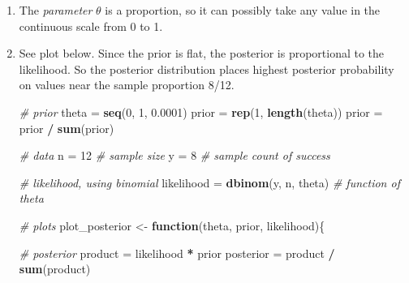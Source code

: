 \documentclass[
]{book}
\newenvironment{Shaded}{\begin{snugshade}}{\end{snugshade}}
\newcommand{\CommentTok}[1]{\textcolor[rgb]{0.56,0.35,0.01}{\textit{#1}}}
\newcommand{\ControlFlowTok}[1]{\textcolor[rgb]{0.13,0.29,0.53}{\textbf{#1}}}
\newcommand{\DecValTok}[1]{\textcolor[rgb]{0.00,0.00,0.81}{#1}}
\newcommand{\FloatTok}[1]{\textcolor[rgb]{0.00,0.00,0.81}{#1}}
\newcommand{\KeywordTok}[1]{\textcolor[rgb]{0.13,0.29,0.53}{\textbf{#1}}}
\newcommand{\NormalTok}[1]{#1}
\newcommand{\OperatorTok}[1]{\textcolor[rgb]{0.81,0.36,0.00}{\textbf{#1}}}
\newcommand{\StringTok}[1]{\textcolor[rgb]{0.31,0.60,0.02}{#1}}
\theoremstyle{definition}
\theoremstyle{definition}
\theoremstyle{definition}
\theoremstyle{remark}
\begin{document}
\begin{enumerate}
\def\labelenumi{\arabic{enumi}.}
\item
  The \emph{parameter} \(\theta\) is a proportion, so it can possibly take any value in the continuous scale from 0 to 1.
\item
  See plot below. Since the prior is flat, the posterior is proportional to the likelihood. So the posterior distribution places highest posterior probability on values near the sample proportion 8/12.

\begin{Shaded}
\begin{Highlighting}[]
\CommentTok{\# prior}
\NormalTok{theta =}\StringTok{ }\KeywordTok{seq}\NormalTok{(}\DecValTok{0}\NormalTok{, }\DecValTok{1}\NormalTok{, }\FloatTok{0.0001}\NormalTok{)}
\NormalTok{prior =}\StringTok{ }\KeywordTok{rep}\NormalTok{(}\DecValTok{1}\NormalTok{, }\KeywordTok{length}\NormalTok{(theta))}
\NormalTok{prior =}\StringTok{ }\NormalTok{prior }\OperatorTok{/}\StringTok{ }\KeywordTok{sum}\NormalTok{(prior)}

\CommentTok{\# data}
\NormalTok{n =}\StringTok{ }\DecValTok{12} \CommentTok{\# sample size}
\NormalTok{y =}\StringTok{ }\DecValTok{8} \CommentTok{\# sample count of success}

\CommentTok{\# likelihood, using binomial}
\NormalTok{likelihood =}\StringTok{ }\KeywordTok{dbinom}\NormalTok{(y, n, theta) }\CommentTok{\# function of theta}


\CommentTok{\# plots}
\NormalTok{plot\_posterior \textless{}{-}}\StringTok{ }\ControlFlowTok{function}\NormalTok{(theta, prior, likelihood)\{}

  \CommentTok{\# posterior}
\NormalTok{  product =}\StringTok{ }\NormalTok{likelihood }\OperatorTok{*}\StringTok{ }\NormalTok{prior}
\NormalTok{  posterior =}\StringTok{ }\NormalTok{product }\OperatorTok{/}\StringTok{ }\KeywordTok{sum}\NormalTok{(product)}


\end{Highlighting}
\end{Shaded}
\end{enumerate}
\end{document}
